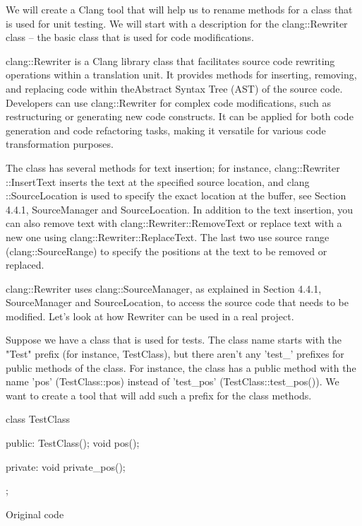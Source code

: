 We will create a Clang tool that will help us to rename methods for a class that is used for unit testing. We will start with a description for the clang::Rewriter class – the basic class that is used for code modifications.



clang::Rewriter is a Clang library class that facilitates source code rewriting operations within a translation unit. It provides methods for inserting, removing, and replacing code within theAbstract Syntax Tree (AST) of the source code. Developers can use clang::Rewriter for complex code modifications, such as restructuring or generating new code constructs. It can be applied for both code generation and code refactoring tasks, making it versatile for various code transformation purposes.

The class has several methods for text insertion; for instance, clang::Rewriter ::InsertText inserts the text at the specified source location, and clang ::SourceLocation is used to specify the exact location at the buffer, see Section 4.4.1, SourceManager and SourceLocation. In addition to the text insertion, you can also remove text with clang::Rewriter::RemoveText or replace text with a new one using clang::Rewriter::ReplaceText. The last two use source range (clang::SourceRange) to specify the positions at the text to be removed or replaced.

clang::Rewriter uses clang::SourceManager, as explained in Section 4.4.1, SourceManager and SourceLocation, to access the source code that needs to be modified. Let's look at how Rewriter can be used in a real project.


Suppose we have a class that is used for tests. The class name starts with the "Test" prefix (for instance, TestClass), but there aren't any 'test\_' prefixes for public methods of the class. For instance, the class has a public method with the name 'pos' (TestClass::pos) instead of 'test\_pos' (TestClass::test\_pos()). We want to create a tool that will add such a prefix for the class methods.

\begin{cpp}
class TestClass {
public:
  TestClass(){};
  void pos(){};

private:
  void private_pos(){};
};
\end{cpp}

Original code

